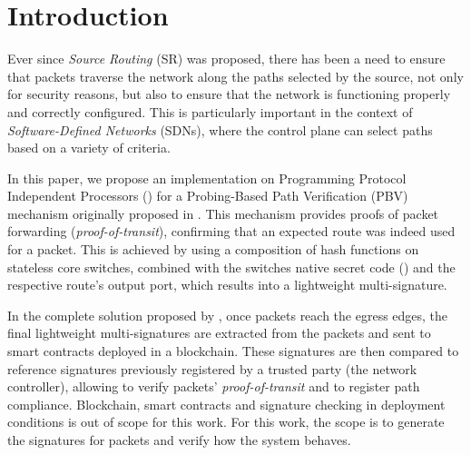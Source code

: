 \section{Introduction}


Ever since \textit{Source Routing} (SR) was proposed, there has been a need to ensure that packets traverse the network along the paths selected by the source, not only for security reasons, but also to ensure that the network is functioning 
properly
and correctly configured. This is particularly important in the context of \textit{Software-Defined Networks} (SDNs), where the control plane can select paths based on a variety of criteria\cite{SRSDN}.

In this paper, we propose an implementation on Programming Protocol Independent Processors (\pIV) for 
a Probing-Based Path Verification (PBV) mechanism originally proposed in \pathsec\cite{pathsec}. 
This mechanism provides proofs of packet forwarding (\textit{proof-of-transit}), confirming that an expected route was indeed used for a packet.
This is achieved by using a composition of hash functions on stateless core switches, 
combined with the switches native secret code (\nodeids) and the respective route's output port, which results into a lightweight multi-signature. 


In the complete solution proposed by \pathsec, once packets reach the egress edges, the final lightweight multi-signatures are extracted from the packets and sent to smart contracts deployed in a blockchain. These signatures are then compared to reference signatures previously registered by a trusted party (the network controller), allowing to verify packets' \textit{proof-of-transit} and to register path compliance. Blockchain, smart contracts and signature checking in deployment conditions is out of scope for this work. For this work, the scope is to generate the signatures for packets and verify how the system behaves.







